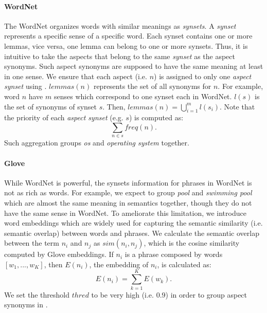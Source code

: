 \paragraph{WordNet}
The WordNet organizes words with similar meanings
as \textit{synsets}.
A \textit{synset} represents a specific sense of a specific word.
Each synset contains one or more lemmas, 
vice versa,
one lemma can belong to one or more synsets.
Thus, it is intuitive to take the aspects
that belong to the same \textit{synset} as the aspect synonyms.
Such aspect synonyms are supposed to have 
the same meaning at least in one sense.
We ensure that each aspect (i.e. $n$) is assigned to
only one \textit{aspect synset} using
.
$lemmas(n)$ represents the set of all synonyms 
for $n$.
For example, word $n$ have $m$ senses which correspond to
one synset each in WordNet.
$l(s)$ is the set of synonyms of synset $s$.
Then, $lemmas(n)=\bigcup\limits_{i=1}^{m} l(s_i)$.
Note that 
the priority of each \textit{aspect synset} (e.g. $s$) is 
computed as: 
\begin{equation}
	\sum\limits_{n \in s}freq(n).
	\label{eq:priority}
\end{equation}
Such aggregation groups \textit{os} and \textit{operating system} together.

\paragraph{Glove}
While WordNet is powerful, the synsets information for phrases 
in WordNet is not as rich as words.
For example, we expect to group \textit{pool} and \textit{swimming pool} which are almost the same
meaning in semantics 
together, though they do not 
have the same sense in WordNet.
To ameliorate this limitation,
we introduce word embeddings
which are widely used for capturing the semantic similarity (i.e. semantic overlap)
between words and phrases.
We calculate the semantic overlap between the term $n_i$ and $n_j$ as $sim(n_i, n_j)$, which is the cosine similarity 
computed by Glove embeddings. 
If $n_i$ is a phrase composed by words $[w_1, ..., w_K]$,
then $E(n_i)$, the embedding of $n_i$, 
is calculated as: 
\begin{equation}
	E(n_i) = \sum\limits_{k=1}^{K}E(w_k). 
	\label{eq:embedding}
\end{equation}
We set the threshold $thred$ to be very high (i.e. $0.9$)
in order to group aspect synonyms in .

